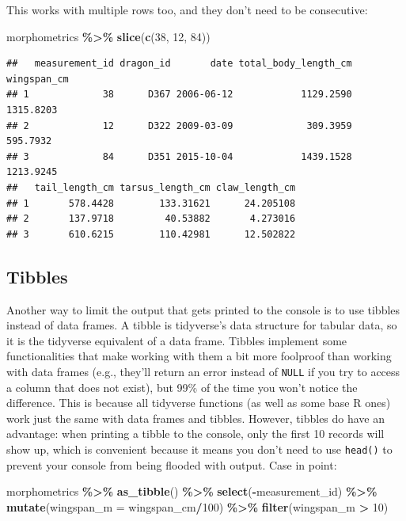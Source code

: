 \documentclass[
]{book}
\newenvironment{Shaded}{\begin{snugshade}}{\end{snugshade}}
\newcommand{\AttributeTok}[1]{\textcolor[rgb]{0.13,0.29,0.53}{#1}}
\newcommand{\DecValTok}[1]{\textcolor[rgb]{0.00,0.00,0.81}{#1}}
\newcommand{\FunctionTok}[1]{\textcolor[rgb]{0.13,0.29,0.53}{\textbf{#1}}}
\newcommand{\NormalTok}[1]{#1}
\newcommand{\SpecialCharTok}[1]{\textcolor[rgb]{0.81,0.36,0.00}{\textbf{#1}}}
\begin{document}
This works with multiple rows too, and they don't need to be consecutive:

\begin{Shaded}
\begin{Highlighting}[]
\NormalTok{morphometrics }\SpecialCharTok{\%\textgreater{}\%} 
  \FunctionTok{slice}\NormalTok{(}\FunctionTok{c}\NormalTok{(}\DecValTok{38}\NormalTok{, }\DecValTok{12}\NormalTok{, }\DecValTok{84}\NormalTok{))}
\end{Highlighting}
\end{Shaded}

\begin{verbatim}
##   measurement_id dragon_id       date total_body_length_cm wingspan_cm
## 1             38      D367 2006-06-12            1129.2590   1315.8203
## 2             12      D322 2009-03-09             309.3959    595.7932
## 3             84      D351 2015-10-04            1439.1528   1213.9245
##   tail_length_cm tarsus_length_cm claw_length_cm
## 1       578.4428        133.31621      24.205108
## 2       137.9718         40.53882       4.273016
## 3       610.6215        110.42981      12.502822
\end{verbatim}

\hypertarget{tibbles}{%
\subsection{Tibbles}\label{tibbles}}

Another way to limit the output that gets printed to the console is to use
tibbles instead of data frames. A tibble is tidyverse's data structure for
tabular data, so it is the tidyverse equivalent of a data frame. Tibbles
implement some functionalities that make working with them a bit more foolproof
than working with data frames (e.g., they'll return an error instead of \texttt{NULL}
if you try to access a column that does not exist), but 99\% of the time you
won't notice the difference. This is because all tidyverse functions (as well as
some base R ones) work just the same with data frames and tibbles. However,
tibbles do have an advantage: when printing a tibble to the console, only the
first 10 records will show up, which is convenient because it means you don't
need to use \texttt{head()} to prevent your console from being flooded with output.
Case in point:

\begin{Shaded}
\begin{Highlighting}[]
\NormalTok{morphometrics }\SpecialCharTok{\%\textgreater{}\%} 
  \FunctionTok{as\_tibble}\NormalTok{() }\SpecialCharTok{\%\textgreater{}\%} 
  \FunctionTok{select}\NormalTok{(}\SpecialCharTok{{-}}\NormalTok{measurement\_id) }\SpecialCharTok{\%\textgreater{}\%} 
  \FunctionTok{mutate}\NormalTok{(}\AttributeTok{wingspan\_m =}\NormalTok{ wingspan\_cm}\SpecialCharTok{/}\DecValTok{100}\NormalTok{) }\SpecialCharTok{\%\textgreater{}\%} 
  \FunctionTok{filter}\NormalTok{(wingspan\_m }\SpecialCharTok{\textgreater{}} \DecValTok{10}\NormalTok{) }
\end{Highlighting}
\end{Shaded}
\end{document}
